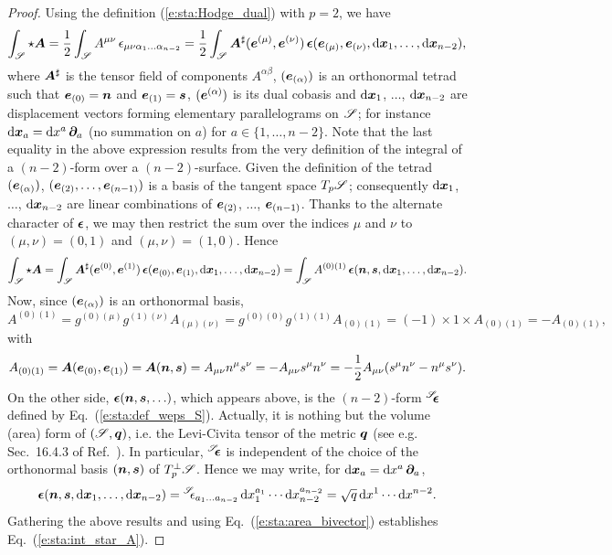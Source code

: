 \begin{proof}
Using the definition (\ref{e:sta:Hodge_dual}) with $p=2$, we have
\[
    \int_{\mathscr{S}} \star \bm{A} =
        \frac{1}{2} \int_{\mathscr{S}} A^{\mu\nu} \,
        \epsilon_{\mu\nu\alpha_1\ldots\alpha_{n-2}} =
         \frac{1}{2} \int_{\mathscr{S}} \bm{A}^\sharp (\bm{e}^{(\mu)}, \bm{e}^{(\nu)})
                \, \bm{\epsilon}(\bm{e}_{(\mu)}, \bm{e}_{(\nu)}, \mathrm{d}\bm{x}_{1},
                    \ldots, \mathrm{d}\bm{x}_{n-2}) ,
\]
where $\bm{A}^\sharp$ is the tensor field of components $A^{\alpha\beta}$,
$(\bm{e}_{(\alpha)})$ is an orthonormal tetrad such that
$\bm{e}_{(0)} = \bm{n}$ and $\bm{e}_{(1)} = \bm{s}$,
$(\bm{e}^{(\alpha)})$ is its dual cobasis and $\mathrm{d}\bm{x}_{1}$, $\ldots$, $\mathrm{d}\bm{x}_{n-2}$
are displacement vectors forming elementary parallelograms on $\mathscr{S}$; for instance
$\mathrm{d}\bm{x}_{a} = \mathrm{d} x^a \, \bm{\partial}_a$ (no summation on $a$)
for $a\in\{1, \ldots, n-2\}$.
Note that the last equality in the above expression results from the very
definition of the integral of a $(n-2)$-form over a $(n-2)$-surface.
Given the definition of the tetrad $(\bm{e}_{(\alpha)})$, $(\bm{e}_{(2)}, \ldots, \bm{e}_{(n-1)})$
is a basis of the tangent space $T_p\mathscr{S}$; consequently
$\mathrm{d}\bm{x}_{1}$, $\ldots$, $\mathrm{d}\bm{x}_{n-2}$ are linear combinations of $\bm{e}_{(2)}$,
$\ldots$, $\bm{e}_{(n-1)}$. Thanks to the alternate character of $\bm{\epsilon}$,
we may then restrict the sum over the indices $\mu$ and $\nu$ to
$(\mu,\nu) = (0,1)$ and $(\mu,\nu) = (1,0)$.
Hence
\[
     \int_{\mathscr{S}} \star \bm{A}
     = \int_{\mathscr{S}}
    \bm{A}^\sharp (\bm{e}^{(0)}, \bm{e}^{(1)})
            \, \bm{\epsilon}(\bm{e}_{(0)}, \bm{e}_{(1)}, \mathrm{d}\bm{x}_{1}, \ldots , \mathrm{d}\bm{x}_{n-2})
    =  \int_{\mathscr{S}} A^{(0)(1)}
    \, \bm{\epsilon}(\bm{n}, \bm{s}, \mathrm{d}\bm{x}_{1}, \ldots , \mathrm{d}\bm{x}_{n-2}) .
\]
Now, since $(\bm{e}_{(\alpha)})$ is an orthonormal basis,
\[
  A^{(0)(1)} = g^{(0)(\mu)} g^{(1)(\nu)} A_{(\mu)(\nu)} = g^{(0)(0)} g^{(1)(1)}
    A_{(0)(1)} = (-1)\times 1 \times A_{(0)(1)} = - A_{(0)(1)} ,
\]
with
\[
    A_{(0)(1)} = \bm{A}(\bm{e}_{(0)}, \bm{e}_{(1)}) = \bm{A}(\bm{n}, \bm{s})
        = A_{\mu\nu} n^\mu s^\nu = - A_{\mu\nu} s^\mu n^\nu
        = - \frac{1}{2} A_{\mu\nu} (s^\mu n^\nu - n^\mu s^\nu) .
\]
On the other side,
$\bm{\epsilon}(\bm{n}, \bm{s}, \ldots)$, which appears above, is the $(n-2)$-form
${}^{\mathscr{S}}\!\!\bm{\epsilon}$ defined by Eq.~(\ref{e:sta:def_weps_S}). Actually, it is
nothing but the volume (area) form of $(\mathscr{S},\bm{q})$, i.e. the Levi-Civita tensor of the metric $\bm{q}$
(see e.g. Sec.~16.4.3 of Ref.~\cite{Gourg13}).
In particular, ${}^{\mathscr{S}}\!\!\bm{\epsilon}$ is independent of the choice of the orthonormal
basis $(\bm{n},\bm{s})$ of $T_p^\perp\mathscr{S}$.
Hence we may write, for
$\mathrm{d}\bm{x}_{a} = \mathrm{d} x^a \, \bm{\partial}_a$,
\[
    \bm{\epsilon}(\bm{n}, \bm{s}, \mathrm{d}\bm{x}_{1}, \ldots , \mathrm{d}\bm{x}_{n-2}) =
        {}^{\mathscr{S}}\!\!\epsilon_{a_1\ldots a_{n-2}} \, \mathrm{d} x_{1}^{a_1}\cdots  \mathrm{d} x_{n-2}^{a_{n-2}}
        = \sqrt{q} \, \mathrm{d} x^1 \cdots  \mathrm{d} x^{n-2} .
\]
Gathering the above results and using Eq.~(\ref{e:sta:area_bivector})
establishes Eq.~(\ref{e:sta:int_star_A}).
\end{proof}

